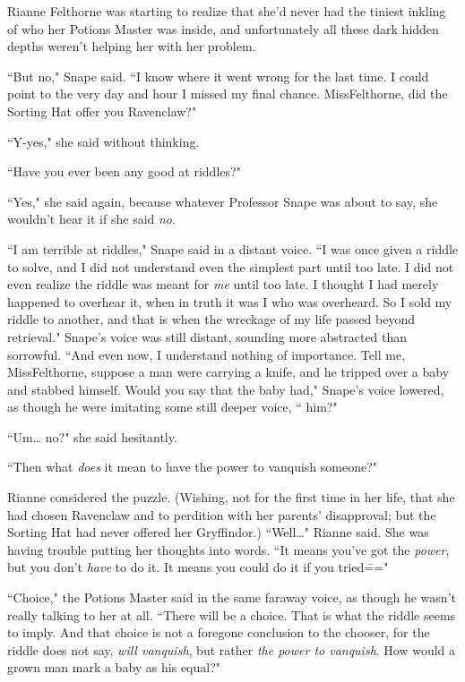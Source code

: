 Rianne Felthorne was starting to realize that she'd never had the tiniest inkling of who her Potions Master was inside, and unfortunately all these dark hidden depths weren't helping her with her problem.

``But no," Snape said. ``I know where it went wrong for the last time. I could point to the very day and hour I missed my final chance. Miss\?Felthorne, did the Sorting Hat offer you Ravenclaw?"

``Y-yes," she said without thinking.

``Have you ever been any good at riddles?"

``Yes," she said again, because whatever Professor Snape was about to say, she wouldn't hear it if she said \emph{no}.

``I am terrible at riddles," Snape said in a distant voice. ``I was once given a riddle to solve, and I did not understand even the simplest part until too late. I did not even realize the riddle was meant for \emph{me} until too late. I thought I had merely happened to overhear it, when in truth it was I who was overheard. So I sold my riddle to another, and that is when the wreckage of my life passed beyond retrieval." Snape's voice was still distant, sounding more abstracted than sorrowful. ``And even now, I understand nothing of importance. Tell me, Miss\?Felthorne, suppose a man were carrying a knife, and he tripped over a baby and stabbed himself. Would you say that the baby had," Snape's voice lowered, as though he were imitating some still deeper voice, `` him?"

``Um{\ldots} no?" she said hesitantly.

``Then what \emph{does} it mean to have the power to vanquish someone?"

Rianne considered the puzzle. (Wishing, not for the first time in her life, that she had chosen Ravenclaw and to perdition with her parents' disapproval; but the Sorting Hat had never offered her Gryffindor.) ``Well{\ldots}" Rianne said. She was having trouble putting her thoughts into words. ``It means you've got the \emph{power}, but you don't \emph{have} to do it. It means you could do it if you tried\==="

``Choice," the Potions Master said in the same faraway voice, as though he wasn't really talking to her at all. ``There will be a choice. That is what the riddle seems to imply. And that choice is not a foregone conclusion to the chooser, for the riddle does not say, \emph{will vanquish}, but rather \emph{the power to vanquish}. How would a grown man mark a baby as his equal?"

